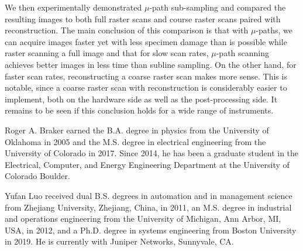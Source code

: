 \documentclass[journal]{IEEEtran}
\begin{document}
We then experimentally demonstrated $\mu$-path sub-sampling
and compared the resulting images to both full raster scans
and course raster scans paired with reconstruction.
The main conclusion of this comparison is that with $\mu$-paths, we
can acquire images faster yet with less specimen damage than is
possible while raster scanning a full image and that for slow scan rates,
$\mu$-path scanning achieves better images in less time than subline sampling.
On the other hand, for faster scan rates, reconstructing a coarse raster scan makes more sense.
This is notable, since a coarse raster scan with reconstruction is considerably
easier to implement, both on the hardware side as well as the post-processing side. 
It remains to be seen if this conclusion holds for a wide range of instruments.

\vspace{-2em}
\begin{IEEEbiography}
  {Roger A. Braker} earned the B.A. degree in physics from the University of Oklahoma in 2005 and the M.S. degree in electrical engineering from the University of Colorado in 2017.
  Since 2014, he has been a graduate student in the Electrical, Computer, and Energy Engineering
  Department at the University of Colorado Boulder.
\end{IEEEbiography}
\begin{IEEEbiography}
  {Yufan Luo}
received dual B.S. degrees in automation and in management science from Zhejiang University, Zhejiang, China, in 2011, an M.S. degree in industrial and operations engineering from the University of Michigan, Ann Arbor, MI, USA, in 2012, and a Ph.D. degree in systems engineering from Boston University in 2019. He is currently with Juniper Networks, Sunnyvale, CA.
\end{IEEEbiography}
\end{document}
